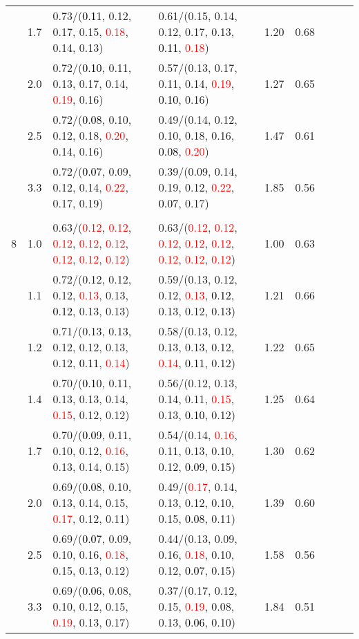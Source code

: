 \documentclass[10pt,a4paper]{report}
\begin{document}
\begin{table}[!htbp]
\begin{center}
{\begin{tabular}{ccllccccc}
			&1.7&0.73/(\textcolor{black}{0.11}, 0.12, 0.17, 0.15, \textcolor{red}{0.18}, 0.14, 0.13)&0.61/(0.15, 0.14, 0.12, 0.17, 0.13, \textcolor{black}{0.11}, \textcolor{red}{0.18})&1.20&0.68\\
			&2.0&0.72/(\textcolor{black}{0.10}, 0.11, 0.13, 0.17, 0.14, \textcolor{red}{0.19}, 0.16)&0.57/(0.13, 0.17, 0.11, 0.14, \textcolor{red}{0.19}, \textcolor{black}{0.10}, 0.16)&1.27&0.65\\
			&2.5&0.72/(\textcolor{black}{0.08}, 0.10, 0.12, 0.18, \textcolor{red}{0.20}, 0.14, 0.16)&0.49/(0.14, 0.12, 0.10, 0.18, 0.16, \textcolor{black}{0.08}, \textcolor{red}{0.20})&1.47&0.61\\
			&3.3&0.72/(\textcolor{black}{0.07}, 0.09, 0.12, 0.14, \textcolor{red}{0.22}, 0.17, 0.19)&0.39/(0.09, 0.14, 0.19, 0.12, \textcolor{red}{0.22}, \textcolor{black}{0.07}, 0.17)&1.85&0.56\\
			&&&&\\
			8			&1.0&0.63/(\textcolor{red}{0.12}, \textcolor{red}{0.12}, \textcolor{red}{0.12}, \textcolor{red}{0.12}, \textcolor{red}{0.12}, \textcolor{red}{0.12}, \textcolor{red}{0.12}, \textcolor{red}{0.12})&0.63/(\textcolor{red}{0.12}, \textcolor{red}{0.12}, \textcolor{red}{0.12}, \textcolor{red}{0.12}, \textcolor{red}{0.12}, \textcolor{red}{0.12}, \textcolor{red}{0.12}, \textcolor{red}{0.12})&1.00&0.63\\
			&1.1&0.72/(0.12, 0.12, 0.12, \textcolor{red}{0.13}, 0.13, \textcolor{black}{0.12}, 0.13, 0.13)&0.59/(0.13, 0.12, 0.12, \textcolor{red}{0.13}, \textcolor{black}{0.12}, 0.13, 0.12, 0.13)&1.21&0.66\\
			&1.2&0.71/(0.13, 0.13, 0.12, 0.12, 0.13, 0.12, \textcolor{black}{0.11}, \textcolor{red}{0.14})&0.58/(0.13, 0.12, 0.13, 0.13, 0.12, \textcolor{red}{0.14}, \textcolor{black}{0.11}, 0.12)&1.22&0.65\\
			&1.4&0.70/(\textcolor{black}{0.10}, 0.11, 0.13, 0.13, 0.14, \textcolor{red}{0.15}, 0.12, 0.12)&0.56/(0.12, 0.13, 0.14, 0.11, \textcolor{red}{0.15}, 0.13, \textcolor{black}{0.10}, 0.12)&1.25&0.64\\
			&1.7&0.70/(\textcolor{black}{0.09}, 0.11, 0.10, 0.12, \textcolor{red}{0.16}, 0.13, 0.14, 0.15)&0.54/(0.14, \textcolor{red}{0.16}, 0.11, 0.13, 0.10, 0.12, \textcolor{black}{0.09}, 0.15)&1.30&0.62\\
			&2.0&0.69/(\textcolor{black}{0.08}, 0.10, 0.13, 0.14, 0.15, \textcolor{red}{0.17}, 0.12, 0.11)&0.49/(\textcolor{red}{0.17}, 0.14, 0.13, 0.12, 0.10, 0.15, \textcolor{black}{0.08}, 0.11)&1.39&0.60\\
			&2.5&0.69/(\textcolor{black}{0.07}, 0.09, 0.10, 0.16, \textcolor{red}{0.18}, 0.15, 0.13, 0.12)&0.44/(0.13, 0.09, 0.16, \textcolor{red}{0.18}, 0.10, 0.12, \textcolor{black}{0.07}, 0.15)&1.58&0.56\\
			&3.3&0.69/(\textcolor{black}{0.06}, 0.08, 0.10, 0.12, 0.15, \textcolor{red}{0.19}, 0.13, 0.17)&0.37/(0.17, 0.12, 0.15, \textcolor{red}{0.19}, 0.08, 0.13, \textcolor{black}{0.06}, 0.10)&1.84&0.51\\
			\bottomrule
		\end{tabular}}
	\end{center}
\end{table}
\end{document}
